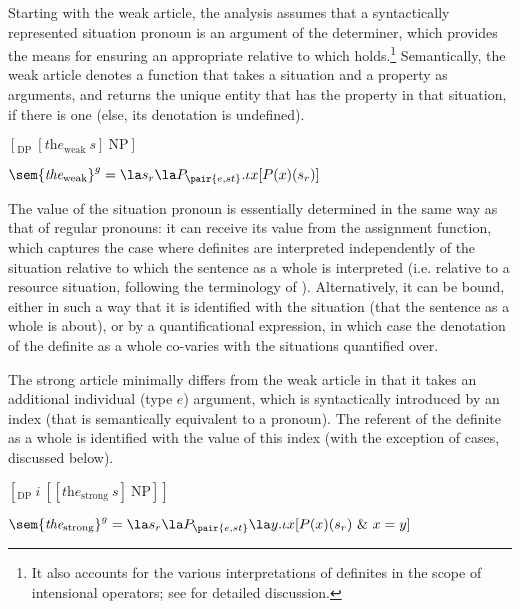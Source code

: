 \documentclass[output=paper
,modfonts
,nonflat]{langscibook}
\begin{document}
Starting with the weak article, the analysis assumes that a
syntactically represented situation pronoun is an argument of the
determiner, which provides the means for ensuring an appropriate
 relative to which  holds.\footnote{It also
accounts for the various interpretations of definites in the scope of
intensional operators; see \citep{Schwarz2009} for detailed
discussion.} Semantically, the weak article denotes a function that
takes a situation and a property as arguments, and returns the unique
entity that has the property in that situation, if there is one (else,
its denotation is undefined).

\begin{exe}
\ex\label{ex:schwarz:13}
\begin{xlist}
\ex\label{ex:schwarz:13a} $ [ _{\text{DP}}\ [\textit{the}_{\text{weak}}\ s]\ \text{NP}]$

\ex\label{ex:schwarz:13b} $\sem{\textit{the}_{\text{weak}}}^g = \la s_r\la P_{\pair{e,st}}.\iota x
[P(x)(s_r)]$ 
\end{xlist}
\end{exe}

The value of the situation pronoun is essentially determined in the
same way as that of regular pronouns: it can receive its value from
the assignment function, which captures the case where definites are
interpreted independently of the situation relative to which the
sentence as a whole is interpreted (i.e. relative to a resource
situation, following the terminology of
\citealt{Fintel1994}). Alternatively, it can be bound, either in such
a way that it is identified with the  situation (that the
sentence as a whole is about), or by a quantificational expression, in
which case the denotation of the definite as a whole co-varies with
the situations quantified over.

The strong article minimally differs from the weak article in that it
takes an additional individual (type $e$) argument, which is
syntactically introduced by an index (that is semantically equivalent
to a pronoun). The referent of the definite as a whole is identified
with the value of this index (with the exception of  cases,
discussed below). 

\begin{exe}
\ex\label{ex:schwarz:14}
\begin{xlist}
\ex\label{ex:schwarz:14a} $ [ _{\text{DP}}\ i\ [[\textit{the}_{\text{strong}}\ s]\ \text{NP}]]$

\ex\label{ex:schwarz:14b} $\sem{\textit{the}_{\text{strong}}}^g = \la s_r\la P_{\pair{e,st}}\la
y.\iota x [P(x)(s_r)\ \&\ x=y]$
\end{xlist}
\end{exe}
\end{document}
